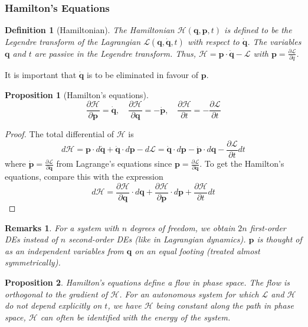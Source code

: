 \documentclass[a4paper]{article}
\newtheorem{defi}{Definition}[section]
\newtheorem{remarks}{Remarks}[section]
\newtheorem{prop}{Proposition}[section]
\theoremstyle{new}
\begin{document}
\subsubsection{Hamilton's Equations}
\begin{defi}[Hamiltonian]
The Hamiltonian $\mathcal{H}(\mathbf{q},\mathbf{p},t)$ is defined to be the Legendre transform of the Lagrangian $\mathcal{L}(\mathbf{q},\mathbf{\dot{q}},t)$ with respect to $\mathbf{\dot{q}}$. The variables $\mathbf{q}$ and $t$ are passive in the Legendre transform. Thus, $\mathcal{H}=\mathbf{p}\cdot\mathbf{\dot{q}}-\mathcal{L}$ with $\mathbf{p}=\frac{\partial\mathcal{L}}{\partial\dot{q}}$. 
\end{defi}
It is important that $\mathbf{\dot{q}}$ is to be eliminated in favour of $\mathbf{p}$. 
\begin{prop}[Hamilton's equations]
$$\frac{\partial\mathcal{H}}{\partial\mathbf{p}}=\mathbf{\dot{q}},\quad\frac{\partial\mathcal{H}}{\partial\mathbf{q}}=-\mathbf{\dot{p}},\quad\frac{\partial\mathcal{H}}{\partial t}=-\frac{\partial\mathcal{L}}{\partial t}$$
\end{prop}
\begin{proof}
The total differential of $\mathcal{H}$ is
$$d\mathcal{H}=\mathbf{p}\cdot d\mathbf{\dot{q}}+\mathbf{\dot{q}}\cdot d\mathbf{p}-d\mathcal{L}=\mathbf{\dot{q}}\cdot d\mathbf{p}-\mathbf{\dot{p}}\cdot d\mathbf{q}-\frac{\partial\mathcal{L}}{\partial t}dt$$
where $\mathbf{\dot{p}}=\frac{\partial\mathcal{L}}{\partial\mathbf{q}}$ from Lagrange's equations since $\mathbf{p}=\frac{\partial\mathcal{L}}{\partial\mathbf{\dot{q}}}$. To get the Hamilton's equations, compare this with the expression $$d\mathcal{H}=\frac{\partial\mathcal{H}}{\partial\mathbf{q}}\cdot d\mathbf{q}+\frac{\partial\mathcal{H}}{\partial\mathbf{p}}\cdot d\mathbf{p}+\frac{\partial\mathcal{H}}{\partial t}dt$$
\end{proof}
\begin{remarks}
For a system with $n$ degrees of freedom, we obtain $2n$ first-order DEs instead of $n$ second-order DEs (like in Lagrangian dynamics). $\mathbf{p}$ is thought of as an independent variables from $\mathbf{q}$ on an equal footing (treated almost symmetrically).
\end{remarks}
\begin{prop}
Hamilton's equations define a flow in phase space. The flow is orthogonal to the gradient of $\mathcal{H}$. For an autonomous system for which $\mathcal{L}$ and $\mathcal{H}$ do not depend explicitly on $t$, we have $\mathcal{H}$ being constant along the path in phase space, $\mathcal{H}$ can often be identified with the energy of the system.
\end{prop}
\end{document}
